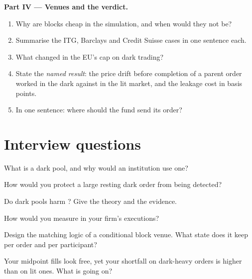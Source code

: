 \begin{problem}
\medskip\noindent\textbf{Part IV --- Venues and the verdict.}
\begin{enumerate}[resume]
\item Why are blocks cheap in the simulation, and when would they not be?
\item Summarise the ITG, Barclays and Credit Suisse cases in one sentence each.
\item What changed in the EU's cap on dark trading?
\item State the \emph{named result}: the price drift before completion of a parent order worked in the dark against in the lit market, and the leakage
cost in basis points.
\item In one sentence: where should the fund send its order?
\end{enumerate}
\end{problem}

\section{Interview questions}

\begin{interviewq}\label{iq:mx:dark-pools-and-blocks:1}
What is a dark pool, and why would an institution use one?
\end{interviewq}

\begin{interviewq}\label{iq:mx:dark-pools-and-blocks:2}
How would you protect a large resting dark order from being detected?
\end{interviewq}

\begin{interviewq}\label{iq:mx:dark-pools-and-blocks:3}
Do dark pools harm ? Give the theory and the evidence.
\end{interviewq}

\begin{interviewq}\label{iq:mx:dark-pools-and-blocks:4}
How would you measure  in your firm's executions?
\end{interviewq}

\begin{interviewq}\label{iq:mx:dark-pools-and-blocks:5}
Design the matching logic of a conditional block venue. What state does it keep per order and per participant?
\end{interviewq}

\begin{interviewq}\label{iq:mx:dark-pools-and-blocks:6}
Your midpoint fills look free, yet your shortfall on dark-heavy orders is higher than on lit ones. What is going on?
\end{interviewq}
